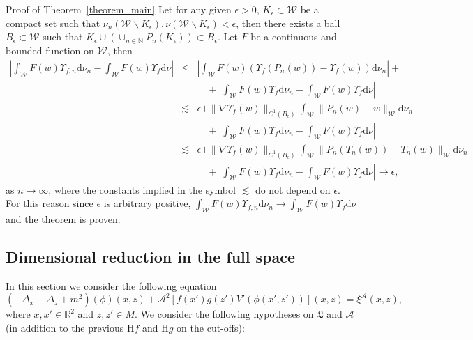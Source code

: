 \documentclass[a4paper,10pt]{article}
\newcommand{\mathd}{\mathrm{d}}
\newenvironment{proof*}[1]{\noindent\textbf{#1\ }}{\hspace*{\fill}$\Box$\medskip}
\begin{document}
\begin{proof*}{Proof of Theorem~\ref{theorem_main}}
  Let for any given $\epsilon > 0$, $K_{\epsilon} \subset \mathcal{W}$ be a
  compact set such that $\nu_n (\mathcal{W} \backslash K_{\epsilon}), \nu
  (\mathcal{W} \backslash K_{\epsilon}) < \epsilon$, then there exists a ball
  $B_{\epsilon} \subset \mathcal{W}$ such that $K_{\epsilon} \cup (\cup_{n \in
  \mathbb{N}} P_n (K_{\epsilon})) \subset B_{\epsilon}$. Let $F$ be a
  continuous and bounded function on $\mathcal{W}$, then
  \begin{eqnarray}
    \left| \int_{\mathcal{W}} F (w) \Upsilon_{f, n} \mathd \nu_n -
    \int_{\mathcal{W}} F (w) \Upsilon_f \mathd \nu \right| & \leqslant &
    \left| \int_{\mathcal{W}} F (w) (\Upsilon_f (P_n (w)) - \Upsilon_f (w))
    \mathd \nu_n \right| + \nonumber\\
    &  & \quad + \left| \int_{\mathcal{W}} F (w) \Upsilon_f \mathd \nu_n -
    \int_{\mathcal{W}} F (w) \Upsilon_f \mathd \nu \right| \nonumber\\
    & \lesssim & \epsilon + \| \nabla \Upsilon_f (w) \|_{C^1 (B_{\epsilon})}
    \int_{\mathcal{W}} \| P_n (w) - w \|_{\mathcal{W}} \mathd \nu_n
    \nonumber\\
    &  & \quad + \left| \int_{\mathcal{W}} F (w) \Upsilon_f \mathd \nu_n -
    \int_{\mathcal{W}} F (w) \Upsilon_f \mathd \nu \right| \nonumber\\
    & \lesssim & \epsilon + \| \nabla \Upsilon_f (w) \|_{C^1 (B_{\epsilon})}
    \int_{\mathcal{W}} \| P_n (T_n (w)) - T_n (w) \|_{\mathcal{W}} \mathd
    \nu_n \nonumber\\
    &  & \quad + \left| \int_{\mathcal{W}} F (w) \Upsilon_f \mathd \nu_n -
    \int_{\mathcal{W}} F (w) \Upsilon_f \mathd \nu \right| \rightarrow
    \epsilon, \nonumber
  \end{eqnarray}
  as $n \rightarrow \infty$, where the constants implied in the symbol
  $\lesssim$ do not depend on $\epsilon$. For this reason since $\epsilon$ is
  arbitrary positive, $\int_{\mathcal{W}} F (w) \Upsilon_{f, n} \mathd \nu_n
  \rightarrow \int_{\mathcal{W}} F (w) \Upsilon_f \mathd \nu$ and the theorem
  is proven.
\end{proof*}

\subsection{Dimensional reduction in the full
space}\label{subsection_extension1}

In this section we consider the following equation
\begin{equation}
  (- \Delta_x - \Delta_z + m^2) (\phi) (x, z) + \mathcal{A}^2 [f (x') g (z')
  V' (\phi (x', z'))] (x, z) = \xi^{\mathcal{A}} (x, z) \label{eq:extension1},
\end{equation}
where $x, x' \in \mathbb{R}^2$ and $z, z' \in M$. We consider the following
hypotheses on $\mathfrak{L}$ and $\mathcal{A}$ (in addition to the previous
H$f$ and H$g$ on the cut-offs):
\end{document}
